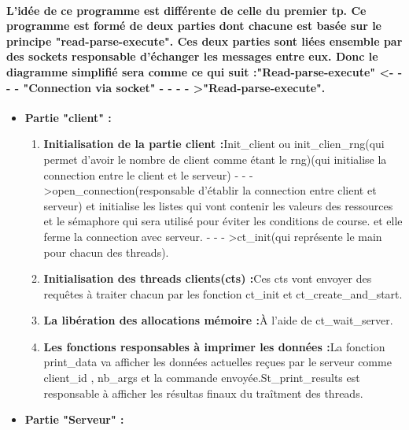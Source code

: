 \documentclass{article}
\begin{document}
\paragraph{L'idée de ce programme est différente de celle du premier tp. Ce programme est formé de deux parties dont chacune est basée sur le principe "read-parse-execute". Ces deux parties sont liées ensemble par des sockets responsable d'échanger les messages entre eux. Donc le diagramme simplifié sera comme ce qui suit :\newline\textbf{"Read-parse-execute" \textless - - - - "Connection via socket" - - - - \textgreater "Read-parse-execute"}.}
\begin{itemize}
\item{\textbf{Partie "client" :}}\newline
\begin{enumerate}
\item \textbf{Initialisation de la partie client :}\newline Init\_client ou init\_clien\_rng(qui permet d'avoir le nombre de client comme étant le rng)(qui initialise la connection entre le client et le serveur) - - - \textgreater open\_connection(responsable d'établir la connection entre client et serveur) et initialise les listes qui vont contenir les valeurs des ressources et le sémaphore qui sera utilisé pour éviter les conditions de course. et elle ferme la connection avec serveur. - - - \textgreater ct\_init(qui représente le main pour chacun des threads).
\item \textbf{Initialisation des threads clients(cts) :}\newline Ces cts vont envoyer des requêtes à traiter chacun par les fonction ct\_init et ct\_create\_and\_start.
\item \textbf{La libération des allocations mémoire :}\newline À l'aide de ct\_wait\_server.
\item \textbf{Les fonctions responsables à imprimer les données :}\newline La fonction print\_data va afficher les données actuelles reçues par le serveur comme client\_id , nb\_args et la commande envoyée.\newline St\_print\_results est responsable à afficher les résultas finaux du traîtment des threads. 
\end{enumerate}
\item{\textbf{Partie "Serveur" :}}\newline
\begin{enumerate}

\end{enumerate}
\end{itemize}
\end{document}
